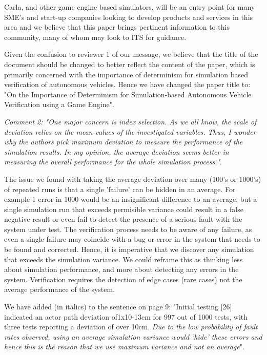 \documentclass[11pt, a4paper]{letter} %
\begin{document}
\begin{letter}
Carla, and other game engine based simulators, will be an entry point for many SME's and start-up companies looking to develop products and services in this area and we believe that this paper brings pertinent information to this community, many of whom may look to ITS for guidance.

Given the confusion to reviewer 1 of our message, we believe that the title of the document should be changed to better reflect the content of the paper, which is primarily concerned with the importance of determinism for simulation based verification of autonomous vehicles. Hence we have changed the paper title to: "On the Importance of Determinism for Simulation-based Autonomous Vehicle Verification using a Game Engine".

\textit{Comment 2: "One major concern is index selection. As we all know, the scale of deviation relies on the mean values of the investigated variables. Thus, I wonder why the authors pick maximum deviation to measure the performance of the simulation results. In my opinion, the average deviation seems better in measuring the overall performance for the whole simulation process."}.

The issue we found with taking the average deviation over many (100's or 1000's) of repeated runs is that a single 'failure' can be hidden in an average. For example 1 error in 1000 would be an insignificant difference to an average, but a single simulation run that exceeds permisible variance could result in a false negative result or even fail to detect the presence of a serious fault with the system under test. The verification process needs to be aware of any failure, as even a single failure may coincide with a bug or error in the system that needs to be found and corrected. Hence, it is imperative that we discover any simulation that exceeds the simulation variance. We could reframe this as thinking less about simulation performance, and more about detecting any errors in the system. Verification requires the detection of edge cases (rare cases) not the average performance of the system.

We have added (in italics) to the sentence on page 9:  "Initial testing [26] indicated an actor path deviation of1x10-13cm for 997 out of 1000 tests, with three tests reporting a deviation of over 10cm. \textit{Due to the low probability of fault rates observed, using an average simulation variance would 'hide' these errors and hence this is the reason that we use maximum variance and not an average}". 


\end{letter}
\end{document}
